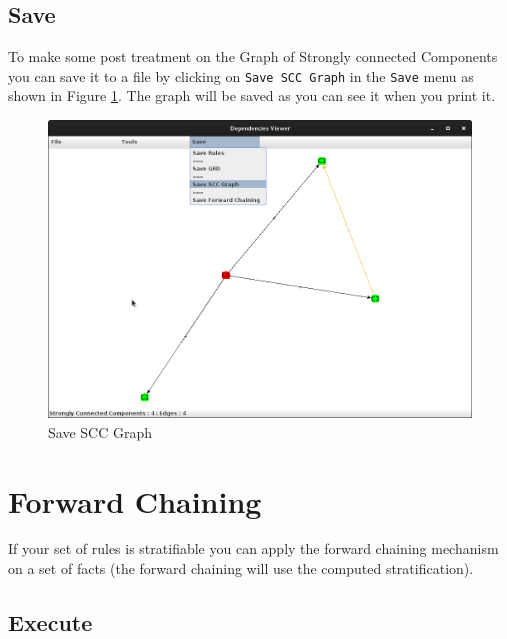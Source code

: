\documentclass[a4paper, 10pt]{article}
\begin{document}
\subsection{Save}
To make some post treatment on the Graph of Strongly connected Components you can save it to a file by clicking on \verb=Save SCC Graph= in the \verb=Save= menu as shown in Figure \ref{fig9}. The graph will be saved as you can see it when you print it.
\begin{figure}
\begin{center}
  \includegraphics[scale=0.25]{pics/fig9.png}
  \caption{Save SCC Graph}
\end{center}
\label{fig9}
\end{figure}

\newpage

\section{Forward Chaining}
If your set of rules is stratifiable you can apply the forward chaining mechanism on a set of facts (the forward chaining will use the computed stratification).
\subsection{Execute}
\end{document}
